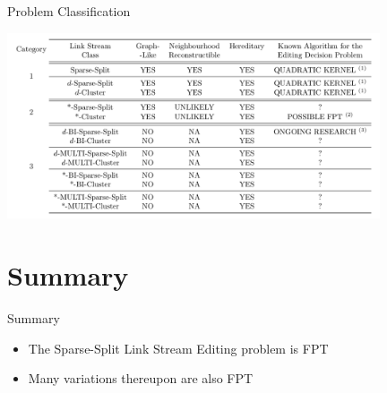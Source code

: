 \documentclass{beamer}
\begin{document}
\begin{frame}{Problem Classification}
  \begin{minipage}{1\linewidth}
    \centering
    \includegraphics[width=110mm]{perspectives.png}
  \end{minipage}
\end{frame}

\section*{Summary}

\begin{frame}{Summary}
  \begin{itemize}
  \item
    The Sparse-Split Link Stream Editing problem is FPT
  \item
    Many variations thereupon are also FPT
  \end{itemize}
\end{frame}
\end{document}
